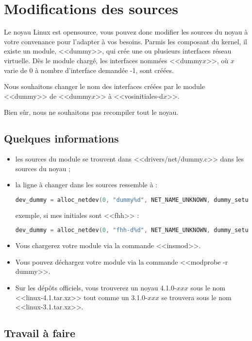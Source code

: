 \documentclass[11pt]{article}
\begin{document}
\section{Modifications des sources}

Le noyau Linux est opensource, vous pouvez donc modifier les sources du noyau à votre convenance pour l'adapter à vos besoins.
Parmis les composant du kernel, il existe un module, <<dummy>>, qui crée une ou plusieurs interfaces réseau virtuelle. Dès le module chargé, les interfaces nommées <<dummy$x$>>, où $x$ varie de 0 à nombre d'interface demandée -1, sont créées.

Nous souhaitons changer le nom des interfaces créées par le module <<dummy>> de <<dummy$x$>> à <<vosinitiales-d$x$>>.

Bien sûr, nous ne souhaitons pas recompiler tout le noyau.

 \subsection*{Quelques informations}

 \begin{itemize}
  \item les sources du module se trouvent dans <<drivers/net/dummy.c>> dans les sources du noyau ;
  \item la ligne à changer dans les sources ressemble à :
\begin{lstlisting}[language=C]
dev_dummy = alloc_netdev(0, "dummy%d", NET_NAME_UNKNOWN, dummy_setup);
\end{lstlisting}
exemple, si mes initiales sont <<fhh>> :
\begin{lstlisting}[language=C]
dev_dummy = alloc_netdev(0, "fhh-d%d", NET_NAME_UNKNOWN, dummy_setup);
\end{lstlisting}
  \item Vous chargerez votre module via la commande <<insmod>>.
  \item Vous pouvez déchargez votre module via la commande <<modprobe -r dummy>>.
  \item Sur les dépôts officiels, vous trouverez un noyau 4.1.0-$xxx$ sous le nom <<linux-4.1.tar.xz>> tout comme un 3.1.0-$xxx$ se trouvera sous le nom <<linux-3.1.tar.xz>>.
 \end{itemize}

 \subsection*{Travail à faire}
\end{document}

